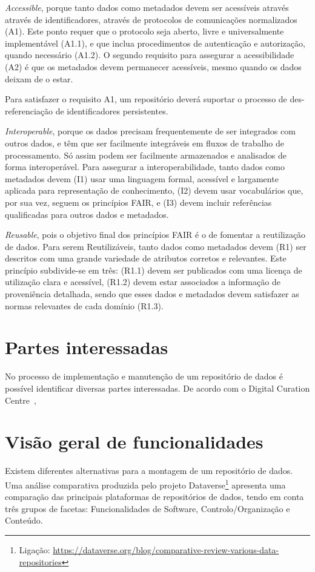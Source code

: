 \documentclass[sigconf,nonacm]{acmart}
\begin{document}
\emph{Accessible}, porque tanto dados como metadados devem ser acessíveis através através de identificadores, através de protocolos de comunicações normalizados (A1). Este ponto requer que o protocolo seja aberto, livre e universalmente implementável (A1.1), e que inclua procedimentos de autenticação e autorização, quando necessário (A1.2). O segundo requisito para assegurar a acessibilidade (A2) é que os metadados devem permanecer acessíveis, mesmo quando os dados deixam de o estar.

Para satisfazer o requisito A1, um repositório deverá suportar o processo de des-referenciação de identificadores persistentes. 

\emph{Interoperable}, porque os dados precisam frequentemente de ser integrados com outros dados, e têm que ser facilmente integráveis em fluxos de trabalho de processamento. Só assim podem ser facilmente armazenados e analisados de forma interoperável. Para assegurar a interoperabilidade, tanto dados como metadados devem (I1) usar uma linguagem formal, acessível e largamente aplicada para representação de conhecimento, (I2) devem usar vocabulários que, por sua vez, seguem os princípios FAIR, e (I3) devem incluir referências qualificadas para outros dados e metadados.

\textit{Reusable}, pois o objetivo final dos princípios FAIR é o de fomentar a reutilização de dados. Para serem Reutilizáveis, tanto dados como metadados devem (R1) ser descritos com uma grande variedade de atributos corretos e relevantes. Este princípio subdivide-se em três: (R1.1) devem ser publicados com uma licença de utilização clara e acessível, (R1.2) devem estar associados a informação de proveniência detalhada, sendo que esses dados e metadados devem satisfazer as normas relevantes de cada domínio (R1.3).

\section{Partes interessadas}

No processo de implementação e manutenção de um repositório de dados é possível identificar diversas partes interessadas. De acordo com o Digital Curation Centre~\cite{DCC_stakeholders}, 

\section{Visão geral de funcionalidades}

Existem diferentes alternativas para a montagem de um repositório de dados. Uma análise comparativa produzida pelo projeto Dataverse\footnote{Ligação:  \url{https://dataverse.org/blog/comparative-review-various-data-repositories}} apresenta uma comparação das principais plataformas de repositórios de dados, tendo em conta três grupos de facetas: Funcionalidades de Software, Controlo/Organização e Conteúdo. 
\end{document}
